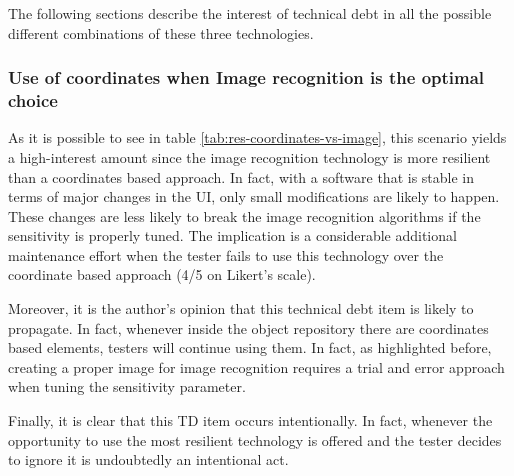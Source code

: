
The following sections describe the interest of technical debt in all the possible different combinations of these three technologies.

\subsubsection{Use of coordinates when Image recognition is the optimal choice} \label{sec:dis-coordinates-vs-image}

As it is possible to see in table  \ref{tab:res-coordinates-vs-image}, this scenario yields a high-interest amount since the image recognition technology is more resilient than a coordinates based approach. In fact, with a software that is stable in terms of major changes in the UI, only small modifications are likely to happen. These changes are less likely to break the image recognition algorithms if the sensitivity is properly tuned. The implication is a considerable additional maintenance effort when the tester fails to use this technology over the coordinate based approach (4/5 on Likert's scale).

Moreover, it is the author's opinion that this technical debt item is likely to propagate. In fact, whenever inside the object repository there are coordinates based elements, testers will continue using them. In fact, as highlighted before, creating a proper image for image recognition requires a trial and error approach when tuning the sensitivity parameter.

Finally, it is clear that this TD item occurs intentionally. In fact, whenever the opportunity to use the most resilient technology is offered and the tester decides to ignore it is undoubtedly an intentional act.
        
